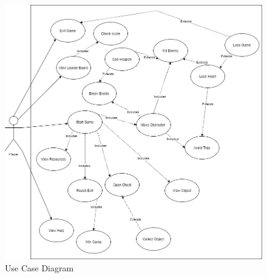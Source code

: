 \documentclass[12pt, titlepage]{article}
\begin{document}
\begin{figure}[h!]
    \centering
    \includegraphics[scale=0.5]{xa3_usecase.jpg}
    \caption{Use Case Diagram}
\end{figure}

\newpage
\end{document}
